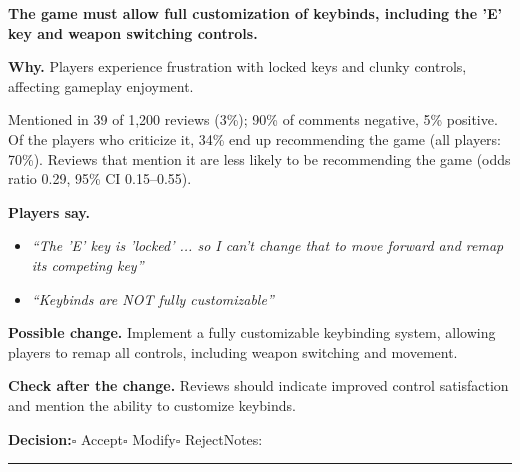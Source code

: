 \documentclass[10pt]{article}
\begin{document}
\begin{tcolorbox}[colback=white,colframe=gR,colbacktitle=lR,coltitle=black,title={\textbf{R5}\quad Control and Customization\hfill\textcolor{gR}{\textbf{Repair first}}},boxrule=0.8pt,arc=2pt,left=6pt,right=6pt,top=4pt,bottom=4pt,before skip=8pt,after skip=8pt]
{\large\textbf{The game must allow full customization of keybinds, including the 'E' key and weapon switching controls.}}

\smallskip
\textbf{Why.} Players experience frustration with locked keys and clunky controls, affecting gameplay enjoyment.

\smallskip
{\small Mentioned in 39 of 1,200 reviews (3\%); 90\% of comments negative, 5\% positive. Of the players who criticize it, 34\% end up recommending the game (all players: 70\%). Reviews that mention it are less likely to be recommending the game {\color{ink2}\footnotesize(odds ratio 0.29, 95\% CI 0.15--0.55)}.}

\smallskip
\textbf{Players say.}
\begin{itemize}[leftmargin=12pt,itemsep=1pt,topsep=2pt]
    \item \textit{``The 'E' key is 'locked' ... so I can't change that to move forward and remap its competing key''}
    \item \textit{``Keybinds are NOT fully customizable''}
\end{itemize}
\textbf{Possible change.} Implement a fully customizable keybinding system, allowing players to remap all controls, including weapon switching and movement.

\smallskip
\textbf{Check after the change.} Reviews should indicate improved control satisfaction and mention the ability to customize keybinds.

\medskip
{\small\textbf{Decision:}\quad $\square$ Accept\quad $\square$ Modify\quad $\square$ Reject\qquad Notes: \rule{0.38\linewidth}{0.4pt}}
\end{tcolorbox}
\end{document}
